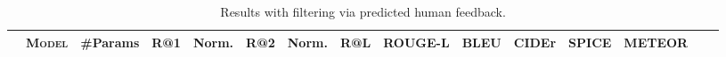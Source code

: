 

\begin{table}
\centering
\caption{%
Results with filtering via predicted human feedback.
}
\label{table:results-comparison-filtering}
\renewcommand{\arraystretch}{1.15} 
\small
\begin{tabularx}{0.8\linewidth}{l l H HH HH Hc cH Hccc}
\toprule
&
\textsc{Model} & 
\textbf{\#Params} & 
R@1 & \sc Norm. & %
R@2 & \sc Norm. & %
R@L & 
\textbf{ROUGE-L} &
\textbf{BLEU} & 
\textbf{CIDEr} & 
\textbf{SPICE} &
\textbf{METEOR} &
\\ \midrule







\end{tabularx}
\end{table}
